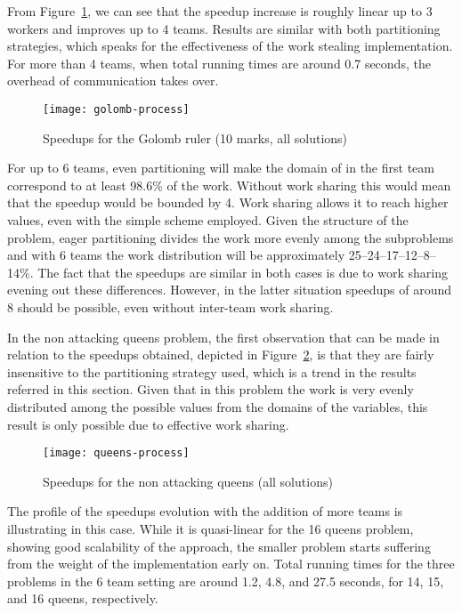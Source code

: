 \documentclass{llncs}
\begin{document}
From Figure~\ref{gra:golomb:process:speedups}, we can see that the
speedup increase is roughly linear up to 3 workers and improves up to
4 teams. Results are similar with both partitioning strategies, which
speaks for the effectiveness of the work stealing implementation. For
more than 4 teams, when total running times are around 0.7 seconds,
the overhead of communication takes over.

\begin{figure}[ht]
  \centering
  \hspace{-7pt}\texttt{[image: golomb-process]}
  \caption{Speedups for the Golomb ruler (10 marks, all solutions)}
  \label{gra:golomb:process:speedups}
\end{figure}

For up to 6 teams, even partitioning will make the domain of  in
the first team correspond to at least 98.6\% of the work. Without work
sharing this would mean that the speedup would be bounded by 4. Work
sharing allows it to reach higher values, even with the simple scheme
employed. Given the structure of the problem, eager partitioning
divides the work more evenly among the subproblems and with 6 teams
the work distribution will be approximately 25--24--17--12--8--14\%.
The fact that the speedups are similar in both cases is due to work
sharing evening out these differences. However, in the latter
situation speedups of around 8 should be possible, even without
inter-team work sharing.

In the non attacking queens problem, the first observation that can be
made in relation to the speedups obtained, depicted in
Figure~\ref{gra:queens:process:speedups}, is that they are fairly
insensitive to the partitioning strategy used, which is a trend in the
results referred in this section. Given that in this problem the work
is very evenly distributed among the possible values from the domains
of the variables, this result is only possible due to effective work
sharing.

\begin{figure}[ht]
  \centering
  \hspace{-7pt}\texttt{[image: queens-process]}
  \caption{Speedups for the non attacking queens (all solutions)\protect\footnotemark}
  \label{gra:queens:process:speedups}
\end{figure}

The profile of the speedups evolution with the addition of more teams
is illustrating in this case. While it is quasi-linear for the 16
queens problem, showing good scalability of the approach, the smaller
problem starts suffering from the weight of the implementation early
on. Total running times for the three problems in the 6 team setting
are around 1.2, 4.8, and 27.5 seconds, for 14, 15, and 16 queens,
respectively.
\end{document}
